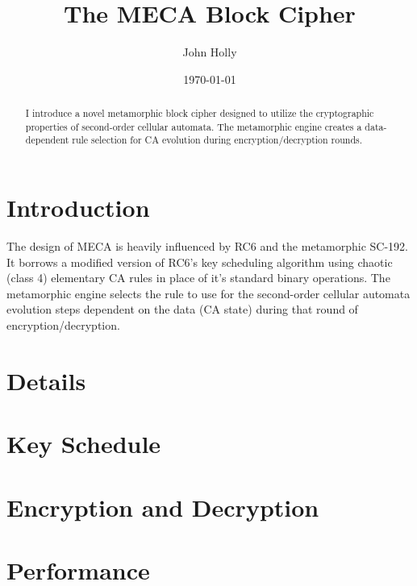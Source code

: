 \documentclass{article}
\title{\textbf{The MECA Block Cipher}}
\author{John Holly}
\date{\today}
\begin{document}
\maketitle

\begin{abstract}
\centering\begin{minipage}{\dimexpr\paperwidth-10cm}
\hspace*{10mm}I introduce a novel metamorphic block cipher designed to utilize the cryptographic properties of second-order cellular automata. The metamorphic engine creates a data-dependent rule selection for CA evolution during encryption/decryption rounds. 
\end{minipage}
\end{abstract}

\bigskip

\section{Introduction}
\hspace*{10mm}%
	The design of MECA is heavily influenced by RC6\cite{RC6} and the metamorphic SC-192\cite{SC-192}. It borrows a modified version of RC6's key scheduling algorithm using chaotic (class 4) elementary CA rules in place of it's standard binary operations. The metamorphic engine selects the rule to use for the second-order cellular automata evolution steps dependent on the data (CA state) during that round of encryption/decryption.

\section{Details}

\section{Key Schedule}

\section{Encryption and Decryption}

\section{Performance}
\end{document}
